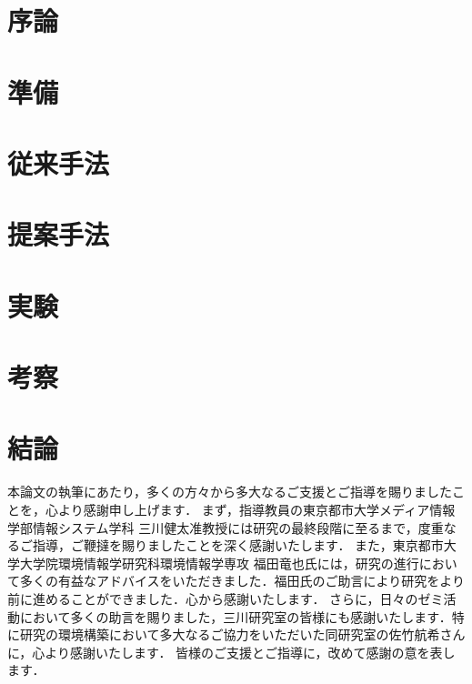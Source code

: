 \documentclass[12pt,uplatex]{jsarticle}   %
\begin{document}
\section{序論}


\section{準備}


\section{従来手法}


\section{提案手法}


\section{実験}


\section{考察}


\section{結論}


\acknowledgements
本論文の執筆にあたり，多くの方々から多大なるご支援とご指導を賜りましたことを，心より感謝申し上げます．
まず，指導教員の東京都市大学メディア情報学部情報システム学科 三川健太准教授には研究の最終段階に至るまで，度重なるご指導，ご鞭撻を賜りましたことを深く感謝いたします．
また，東京都市大学大学院環境情報学研究科環境情報学専攻 福田竜也氏には，研究の進行において多くの有益なアドバイスをいただきました．福田氏のご助言により研究をより前に進めることができました．心から感謝いたします．
さらに，日々のゼミ活動において多くの助言を賜りました，三川研究室の皆様にも感謝いたします．特に研究の環境構築において多大なるご協力をいただいた同研究室の佐竹航希さんに，心より感謝いたします．
皆様のご支援とご指導に，改めて感謝の意を表します．
\end{document}
